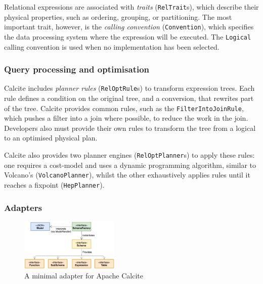 Relational expressions are associated with \emph{traits} (\texttt{RelTrait}s), which describe their physical properties, such as ordering, grouping, or partitioning. The most important trait, however, is the \emph{calling convention} (\texttt{Convention}), which specifies the data processing system where the expression will be executed. The \texttt{Logical} calling convention is used when no implementation has been selected.

\subsubsection{Query processing and optimisation}

Calcite includes \emph{planner rules} (\texttt{RelOptRule}s) to transform expression trees. Each rule defines a condition on the original tree, and a conversion, that rewrites part of the tree. Calcite provides common rules, such as the \texttt{FilterIntoJoinRule}, which pushes a filter into a join where possible, to reduce the work in the join. Developers also must provide their own rules to transform the tree from a logical to an optimised physical plan.

Calcite also provides two planner engines (\texttt{RelOptPlanner}s) to apply these rules: one requires a cost-model and uses a dynamic programming algorithm, similar to Volcano's \cite{Graefe:1994:VEP:627290.627558} (\texttt{VolcanoPlanner}), whilst the other exhaustively applies rules until it reaches a fixpoint (\texttt{HepPlanner}).

\subsubsection{Adapters}

\begin{figure}[H]
\includegraphics[width=0.42\textwidth]{appendix/calcite-adapter.png}
\centering
\caption{A minimal adapter for Apache Calcite \cite{Begoli:2018:ACF:3183713.3190662}}
\label{fig:calcite-adapter}
\end{figure}

